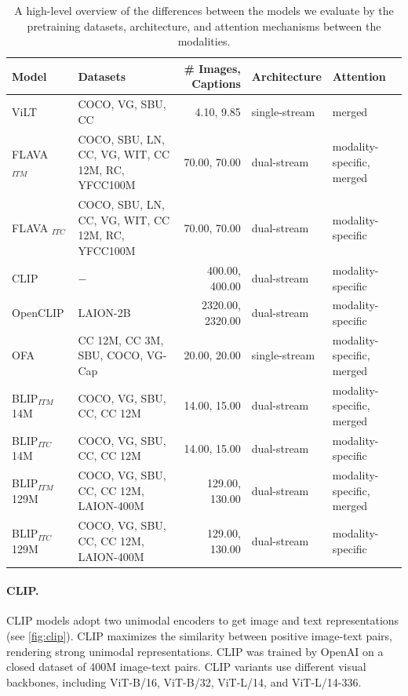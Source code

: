 \begin{table}[ht]
    \centering
    \small
    \begin{adjustbox}{max width=\textwidth}
    \begin{tabular}{l|lr|l|l}
    \toprule
    Model & Datasets & \# Images, Captions & Architecture & Attention \\\midrule
    ViLT \cite{kim2021vilt}  & COCO, VG, SBU, CC & 4.10, 9.85 & single-stream  & merged \\
    FLAVA $_{ITM}$ \cite{singh2022flava}  & COCO, SBU, LN, CC, VG, WIT, CC 12M, RC, YFCC100M & 70.00, 70.00 & dual-stream & modality-specific, merged \\
    FLAVA $_{ITC}$ \cite{singh2022flava}  & COCO, SBU, LN, CC, VG, WIT, CC 12M, RC, YFCC100M & 70.00, 70.00 & dual-stream & modality-specific \\
    CLIP \cite{radford2021clip}  & $-$ & 400.00, 400.00 & dual-stream & modality-specific \\
    OpenCLIP \cite{ilharco_gabriel_2021_5143773}  & LAION-2B & 2320.00, 2320.00 & dual-stream & modality-specific \\
    OFA \cite{wang2022unifying} &  CC 12M, CC 3M, SBU, COCO, VG-Cap  &  20.00, 20.00 &   single-stream & modality-specific, merged \\
    BLIP$_{ITM}$ 14M \cite{li2022blip} &  COCO, VG, SBU, CC, CC 12M  &  14.00, 15.00 &   dual-stream & modality-specific, merged \\
    BLIP$_{ITC}$ 14M \cite{li2022blip} &  COCO, VG, SBU, CC, CC 12M & 14.00, 15.00 &   dual-stream &         modality-specific \\
    BLIP$_{ITM}$ 129M \cite{li2022blip} & COCO, VG, SBU, CC, CC 12M, LAION-400M & 129.00,   130.00 &   dual-stream & modality-specific, merged \\
    BLIP$_{ITC}$ 129M \cite{li2022blip} & COCO, VG, SBU, CC, CC 12M, LAION-400M & 129.00,   130.00 &   dual-stream &         modality-specific \\
    \bottomrule
    \end{tabular}
    \end{adjustbox}
    \caption{A high-level overview of the differences between the models we evaluate by the pretraining datasets, architecture, and attention mechanisms between the modalities.}
    \label{tab:model-types-ours}
\end{table}

\paragraph{CLIP.} CLIP \cite{radford2021clip} models adopt two
unimodal encoders to get image and text representations (see \cref{fig:clip}). CLIP maximizes the similarity between positive image-text pairs, rendering strong unimodal representations. CLIP was trained by OpenAI on a closed dataset of 400M image-text pairs. CLIP variants use different visual backbones, including ViT-B/16, ViT-B/32, ViT-L/14, and ViT-L/14-336.

